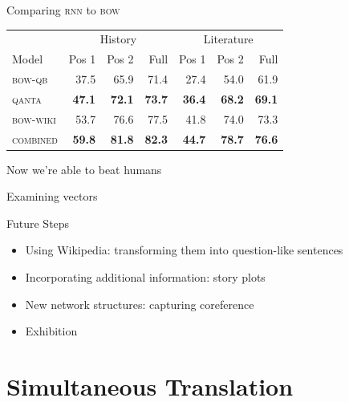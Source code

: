 \documentclass[compress]{beamer}
\newcommand{\gfxq}[2]{
\begin{center}
	\texttt{[image: qb/\#1]}
\end{center}
}
\begin{document}
\begin{frame}{Comparing \textsc{rnn} to \textsc{bow}}

\begin{tabular}{lrrrrrr}
\hline
& \multicolumn{3}{c}{History} & \multicolumn{3}{c}{Literature}\\
Model    & Pos 1 & Pos 2 & Full & Pos 1 & Pos 2 & Full \\
\hline
\textsc{bow-qb} & 37.5 & 65.9 & 71.4 & 27.4 & 54.0 & 61.9 \\
\textsc{qanta} & \bf 47.1 & \bf 72.1 & \bf 73.7 & \bf 36.4 & \bf 68.2 & \bf 69.1 \\
\hline
\textsc{bow-wiki} & 53.7 & 76.6 & 77.5 & 41.8 & 74.0 & 73.3 \\
\textsc{combined} & \bf 59.8 & \bf 81.8 & \bf 82.3 & \bf 44.7 & \bf 78.7 & \bf 76.6 \\
\hline
\end{tabular}




\end{frame}

\begin{frame}{Now we're able to beat humans}

  \only<2>{\gfxq{human_literature}{1.0}}
  \only<1>{\gfxq{human_history}{1.0}}

\end{frame}

\begin{frame}{Examining vectors}

  \only<1>{\gfxq{mann}{.65}}
  \only<2>{\gfxq{cabot}{.6}}

\end{frame}

\begin{frame}{Future Steps}

  \begin{itemize}
    \item Using Wikipedia: transforming them into question-like sentences
    \item Incorporating additional information: story plots
    \item New network structures: capturing coreference
    \item Exhibition
  \end{itemize}

\end{frame}

\section{Simultaneous Translation}
\end{document}
